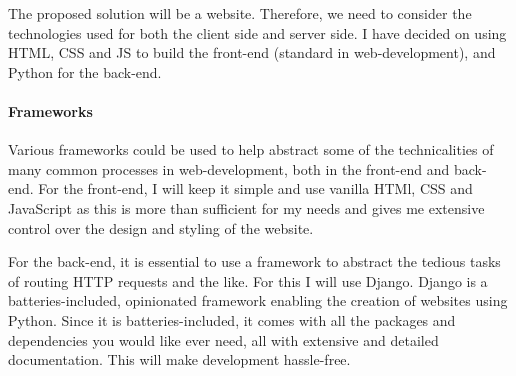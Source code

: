 \documentclass{article}
\begin{document}
The proposed solution will be a website. Therefore, we need to consider the technologies used for both the client side and server side. I have decided on using HTML, CSS and JS to build the front-end (standard in web-development), and Python for the back-end.

\paragraph{Frameworks}

Various frameworks could be used to help abstract some of the technicalities of many common processes in web-development, both in the front-end and back-end. For the front-end, I will keep it simple and use vanilla HTMl, CSS and JavaScript as this is more than sufficient for my needs and gives me extensive control over the design and styling of the website. 

For the back-end, it is essential to use a framework to abstract the tedious tasks of routing HTTP requests and the like. For this I will use Django. Django is a batteries-included, opinionated framework enabling the creation of websites using Python. Since it is batteries-included, it comes with all the packages and dependencies you would like ever need, all with extensive and detailed documentation. This will make development hassle-free. 
\end{document}
